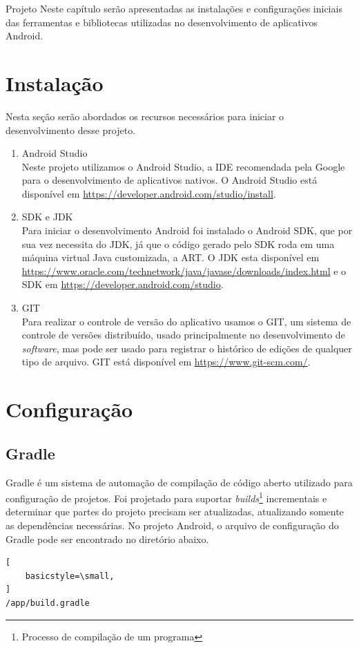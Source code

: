 \documentclass[
	12pt,				%
	openany,			%
	twoside,			%
	a4paper,			%
	english,			%
	french,				%
	spanish,			%
	brazil				%
	]{abntex2}
\begin{document}
\begin{chapter}{Projeto}
Neste capítulo serão apresentadas as instalações e configurações iniciais das ferramentas e bibliotecas utilizadas no desenvolvimento de aplicativos Android.
\section{Instalação} Nesta seção serão abordados os recursos necessários para iniciar o desenvolvimento desse projeto.
\begin{enumerate}
  \item{Android Studio} \\
  Neste projeto utilizamos o Android Studio, a IDE recomendada pela Google para o desenvolvimento de aplicativos nativos. O Android Studio está disponível em \url{https://developer.android.com/studio/install}.
  \item{SDK e JDK} \\ Para iniciar o desenvolvimento Android foi instalado o Android SDK, que por sua vez necessita do JDK, já que o código gerado pelo SDK roda em uma máquina virtual Java customizada, a ART.
  O JDK esta disponível em \url{https://www.oracle.com/technetwork/java/javase/downloads/index.html} e o SDK em \url{https://developer.android.com/studio}.
  \item{GIT} \\
  Para realizar o controle de versão do aplicativo usamos o GIT, um sistema de controle de versões distribuído, usado principalmente no desenvolvimento de \textit{software}, mas pode ser usado para registrar o histórico de edições de qualquer tipo de arquivo. 
  GIT está disponível em \url{https://www.git-scm.com/}.
  
\end{enumerate}



\section{Configuração}
\subsection{Gradle}
Gradle é um sistema de automação de compilação de código aberto utilizado para configuração de projetos. Foi projetado para suportar \textit{builds}\footnote{Processo de compilação de um programa} incrementais e determinar que partes do projeto precisam ser atualizadas, atualizando somente as dependências necessárias.
No projeto Android, o arquivo de configuração do Gradle pode ser encontrado no diretório abaixo. \begin{lstlisting}[
    basicstyle=\small,
]
/app/build.gradle
\end{lstlisting}

\end{chapter}
\end{document}
